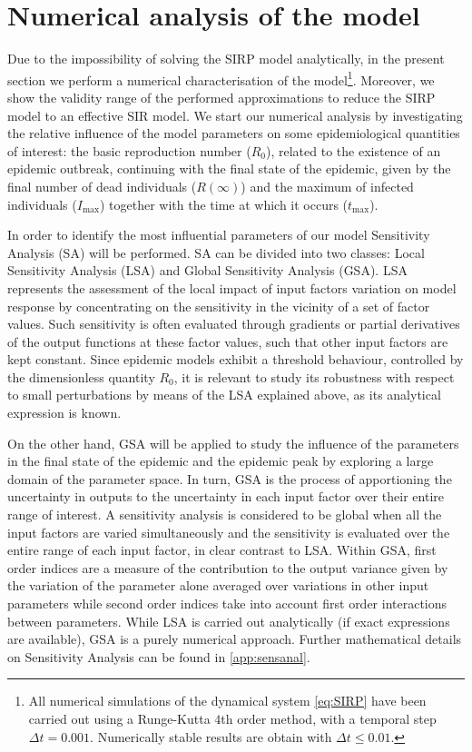 \section{Numerical analysis of the model} \label{sec:numericalanalysis}

Due to the impossibility of solving the SIRP model analytically,
in the present section we perform a numerical characterisation of the
model\footnote{All numerical simulations of the dynamical system
    \cref{eq:SIRP} have been carried out using a Runge-Kutta $4$th order
    method,
    with a temporal step $\Delta t=0.001$. Numerically stable results are
    obtain
    with $\Delta t\le 0.01$.}.
Moreover, we show the validity range of the performed approximations to
reduce the SIRP model to an effective SIR model. We start our numerical
analysis by investigating the relative influence of the model parameters on
some epidemiological quantities of interest: the basic reproduction number
($R_0$), related to the existence of an epidemic outbreak, continuing with the
final state of the epidemic, given by the final number of dead individuals
($R(\infty)$) and the maximum of infected individuals ($I_{\textrm{max}}$)
together with the time at which it occurs ($t_{\textrm{max}}$).

In order to identify the most influential parameters of our model
Sensitivity Analysis (SA) will be performed. SA can be divided into two
classes: Local Sensitivity Analysis (LSA) and Global Sensitivity Analysis
(GSA). LSA represents the assessment of the local impact of input factors
variation on model response by concentrating on the sensitivity in the vicinity
of a set of factor values. Such sensitivity is often evaluated through
gradients or partial derivatives of the output functions at these factor
values, such that other input factors are kept constant.
Since epidemic models exhibit a threshold behaviour, controlled by the
dimensionless quantity
$R_0$, it is relevant to study its robustness with respect to small
perturbations by means of the LSA explained above, as its analytical expression
is known.

On the other hand, GSA will be applied to study the influence of the
parameters in the final state of the epidemic and the epidemic peak by
exploring a large domain of the parameter space. In turn, GSA is the process of
apportioning the uncertainty in outputs to the uncertainty in each input factor
over their entire range of interest. A sensitivity analysis is considered to be
global when all the input factors are varied simultaneously and the sensitivity
is evaluated over the entire range of each input factor, in clear contrast to
LSA. Within GSA, first order indices are a measure of the contribution to the
output variance given by the variation of the parameter alone averaged over
variations in other input parameters while second order indices take into
account first order interactions between parameters. While LSA is carried out
analytically (if exact expressions are available), GSA is a purely numerical
approach. Further mathematical details on Sensitivity Analysis can be found in
\cref{app:sensanal}.

